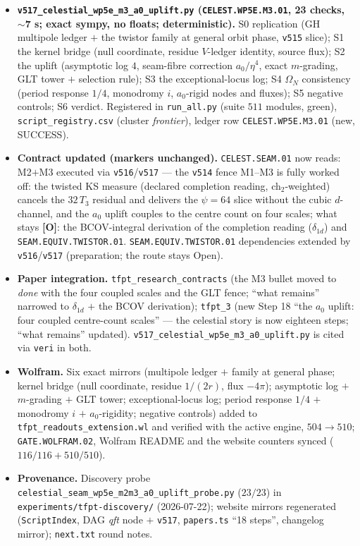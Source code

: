 \documentclass[11pt]{article}
\providecommand{\mO}{\textbf{[O]}}\providecommand{\mX}{\textbf{[X]}}
\begin{document}
\begin{itemize}[leftmargin=1.5em]
\item \textbf{\texttt{v517\_celestial\_wp5e\_m3\_a0\_uplift.py} (\texttt{CELEST.WP5E.M3.01},
23 checks, $\sim$7 s; exact sympy, no floats; deterministic).} S0 replication (GH multipole
ledger $+$ the twistor family at general orbit phase, \texttt{v515} slice); S1 the kernel bridge
(null coordinate, residue $V$-ledger identity, source flux); S2 the uplift (asymptotic log $4$,
seam-fibre correction $a_0/\eta^4$, exact $m$-grading, GLT tower $+$ selection rule); S3 the
exceptional-locus log; S4 $\Omega_N$ consistency (period response $1/4$, monodromy $i$, $a_0$-rigid
nodes and fluxes); S5 negative controls; S6 verdict. Registered in \texttt{run\_all.py} (suite
$511$ modules, green), \texttt{script\_registry.csv} (cluster \emph{frontier}), ledger row
\texttt{CELEST.WP5E.M3.01} (new, SUCCESS).
\item \textbf{Contract updated (markers unchanged).} \texttt{CELEST.SEAM.01} now reads: M2$+$M3
executed via \texttt{v516}/\texttt{v517} --- the \texttt{v514} fence M1--M3 is fully worked off:
the twisted KS measure (declared completion reading, ch$_2$-weighted) cancels the $32\,T_3$
residual and delivers the $\psi=64$ slice without the cubic $d$-channel, and the $a_0$ uplift
couples to the centre count on four scales; what stays \mO: the BCOV-integral derivation of the
completion reading ($\delta_{1d}$) and \texttt{SEAM.EQUIV.TWISTOR.01}.
\texttt{SEAM.EQUIV.TWISTOR.01} dependencies extended by \texttt{v516}/\texttt{v517}
(preparation; the route stays Open).
\item \textbf{Paper integration.} \texttt{tfpt\_research\_contracts} (the M3 bullet moved to
\emph{done} with the four coupled scales and the GLT fence; ``what remains'' narrowed to
$\delta_{1d}$ $+$ the BCOV derivation); \texttt{tfpt\_3} (new Step 18 ``the $a_0$ uplift: four
coupled centre-count scales'' --- the celestial story is now eighteen steps; ``what remains''
updated). \texttt{v517\_celestial\_wp5e\_m3\_a0\_uplift.py} is cited via \texttt{veri} in both.
\item \textbf{Wolfram.} Six exact mirrors (multipole ledger $+$ family at general phase; kernel
bridge (null coordinate, residue $1/(2r)$, flux $-4\pi$); asymptotic log $+$ $m$-grading $+$ GLT
tower; exceptional-locus log; period response $1/4$ $+$ monodromy $i$ $+$ $a_0$-rigidity; negative
controls) added to \texttt{tfpt\_readouts\_extension.wl} and verified with the active engine,
$504\to510$; \texttt{GATE.WOLFRAM.02}, Wolfram README and the website counters synced
($116/116+510/510$).
\item \textbf{Provenance.} Discovery probe
\texttt{celestial\_seam\_}\allowbreak\texttt{wp5e\_m2m3\_}\allowbreak\texttt{a0\_uplift\_probe.py}
($23/23$) in \texttt{experiments/tfpt-discovery/} (2026-07-22); website mirrors regenerated
(\texttt{ScriptIndex}, DAG \emph{qft} node $+$ \texttt{v517}, \texttt{papers.ts} ``18 steps'',
changelog mirror); \texttt{next.txt} round notes.
\end{itemize}
\end{document}
